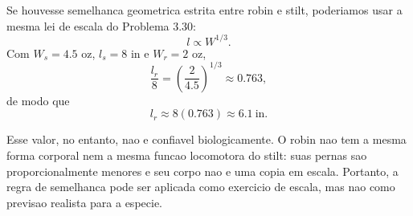 Se houvesse semelhanca geometrica estrita entre robin e stilt, poderiamos usar a mesma lei de escala do Problema 3.30:
\[
l\propto W^{1/3}.
\]
Com $W_s=4.5$ oz, $l_s=8$ in e $W_r=2$ oz,
\[
\frac{l_r}{8}=\left(\frac{2}{4.5}\right)^{1/3}\approx 0.763,
\]
de modo que
\[
l_r\approx 8(0.763)\approx 6.1\ \text{in}.
\]

Esse valor, no entanto, nao e confiavel biologicamente. O robin nao tem a mesma forma corporal nem a mesma funcao locomotora do stilt: suas pernas sao proporcionalmente menores e seu corpo nao e uma copia em escala. Portanto, a regra de semelhanca pode ser aplicada como exercicio de escala, mas nao como previsao realista para a especie.

